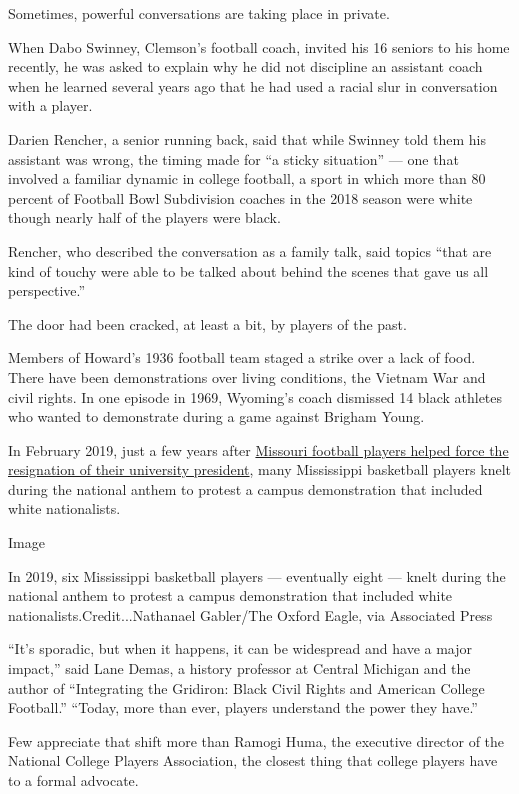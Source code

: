 Sometimes, powerful conversations are taking place in private.

When Dabo Swinney, Clemson's football coach, invited his 16 seniors to
his home recently, he was asked to explain why he did not discipline an
assistant coach when he learned several years ago that he had used a
racial slur in conversation with a player.

Darien Rencher, a senior running back, said that while Swinney told them
his assistant was wrong, the timing made for ``a sticky situation'' ---
one that involved a familiar dynamic in college football, a sport in
which more than 80 percent of Football Bowl Subdivision coaches in the
2018 season were white though nearly half of the players were black.

Rencher, who described the conversation as a family talk, said topics
``that are kind of touchy were able to be talked about behind the scenes
that gave us all perspective.''

The door had been cracked, at least a bit, by players of the past.

Members of Howard's 1936 football team staged a strike over a lack of
food. There have been demonstrations over living conditions, the Vietnam
War and civil rights. In one episode in 1969, Wyoming's coach dismissed
14 black athletes who wanted to demonstrate during a game against
Brigham Young.

In February 2019, just a few years after
\href{https://www.nytimes.com/2015/11/09/us/missouri-football-players-boycott-in-protest-of-university-president.html}{Missouri
football players helped force the resignation of their university
president}, many Mississippi basketball players knelt during the
national anthem to protest a campus demonstration that included white
nationalists.

Image

In 2019, six Mississippi basketball players --- eventually eight ---
knelt during the national anthem to protest a campus demonstration that
included white nationalists.Credit...Nathanael Gabler/The Oxford Eagle,
via Associated Press

``It's sporadic, but when it happens, it can be widespread and have a
major impact,'' said Lane Demas, a history professor at Central Michigan
and the author of ``Integrating the Gridiron: Black Civil Rights and
American College Football.'' ``Today, more than ever, players understand
the power they have.''

Few appreciate that shift more than Ramogi Huma, the executive director
of the National College Players Association, the closest thing that
college players have to a formal advocate.

